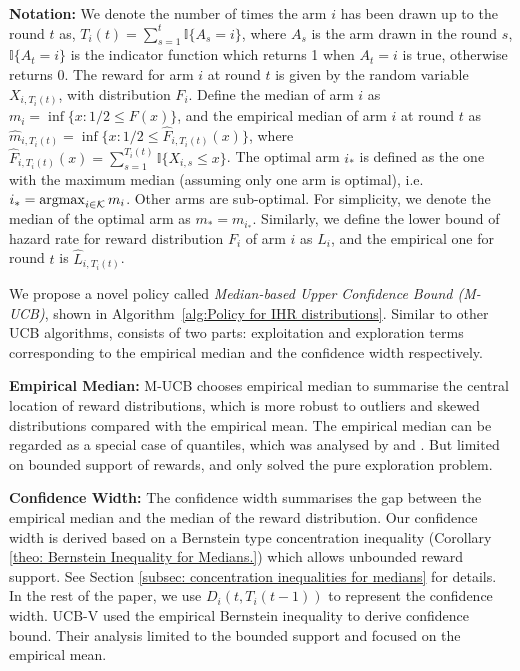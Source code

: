 \textbf{Notation:} We denote the number of times the arm $i$ has been drawn up to the round $t$ as,
$T_i(t) = \sum_{s = 1}^t \mathbb{I} \{A_s = i\}$,
where $A_s$ is the arm drawn in the round $s$, $\mathbb{I}\{A_t = i\}$ is the indicator function which returns 1 when $A_t = i$ is true, otherwise returns 0.
The reward for arm $i$ at round $t$ is given by the random variable $X_{i,T_i(t)}$,
with distribution $F_i$.
Define the median of arm $i$ as $m_i =\inf \{x : 1/2 \leq F(x)\}$, and the empirical median of arm $i$ at round $t$ as $\hat{m}_{i,T_i(t)}  =\inf \{x : 1/2 \leq \hat{F}_{i,T_i(t)}(x)\}$, where $\hat{F}_{i,T_i(t)}(x) = \sum_{s=1}^{T_i(t)} \mathbb{I}\{X_{i, s} \leq x\}$.
The optimal arm $i_\ast$ is defined as the one with the maximum median (assuming only one arm is optimal), i.e. $i_\ast = \operatorname*{argmax}_{i \in \mathcal{K}} m_i$. Other arms are sub-optimal.
For simplicity, we denote the median of the optimal arm as $m_\ast = m_{i_\ast}$. Similarly, we define the lower bound of hazard rate for reward distribution $F_i$ of arm $i$ as $L_i$, and the empirical one for round $t$ is $\hat{L}_{i, T_i(t)}$.


We propose a novel policy called \textit{Median-based Upper Confidence Bound (M-UCB)},
shown in Algorithm~\ref{alg:Policy for IHR distributions}. Similar to other UCB algorithms,
\ourpolicy \space consists of two parts: exploitation and exploration terms corresponding
to the empirical median and the confidence width respectively.

 \textbf{Empirical Median:} M-UCB chooses empirical median to summarise the central location of reward distributions, which is more robust to outliers and skewed distributions compared with the empirical mean.
    The empirical median can be regarded as a special case of quantiles, which was analysed by  \textcite{cassel_general_2018} and \textcite{a2019concentration}. But \textcite{cassel_general_2018} limited on bounded support of rewards, and \cite{a2019concentration} only solved the pure exploration problem.

\textbf{Confidence Width:}
    The confidence width summarises the gap between the empirical median and the median of the reward distribution.
    Our confidence width is derived based on a Bernstein type concentration inequality (Corollary \ref{theo: Bernstein Inequality for Medians.}) which allows unbounded reward support.
    See Section \ref{subsec: concentration inequalities for medians} for details.
    In the rest of the paper, we use $D_i(t, T_i(t-1))$ to represent the confidence width.
    UCB-V \cite{audibert2009exploration} used the empirical Bernstein inequality to derive confidence bound. Their analysis limited to the bounded support and focused on the empirical mean.

